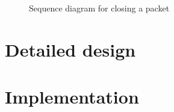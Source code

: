 \begin{landscape}
    \begin{figure}[H]
        \centering
        \caption{Sequence diagram for closing a packet}
        \label{fig:admin-xp-increment-process}
    \end{figure}
\end{landscape}


\section{Detailed design}




\section{Implementation}
